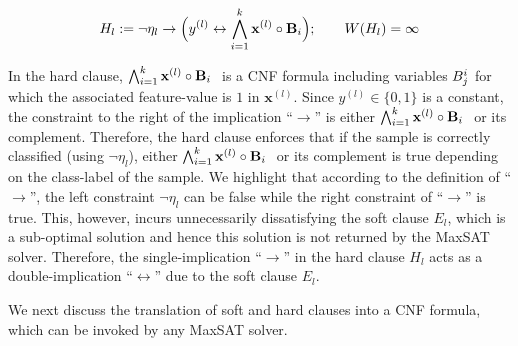 \begin{itemize}
	\begin{equation}
			\label{interpretability_imli_hard_clause_rule_consistency}
		H_l:= \neg \eta_l \rightarrow \Big(y^{(l)}\leftrightarrow \bigwedge_{i=1}^k {\mathbf{x}^{(l)}} \circ {\ensuremath{\mathbf{B}}_{i}}\Big); \qquad  W \! \left( H_l \right)=\infty
	\end{equation}
	
	In the hard clause, $ \bigwedge_{i=1}^k {\mathbf{x}^{(l)}} \circ {\ensuremath{\mathbf{B}}_{i}}\ $ is a CNF formula including variables $ B_j^i $ for which the associated  feature-value is $ 1 $ in  $ \mathbf{x}^{(l)} $. Since $ y^{(l)} \in \{0,1\} $ is a constant, the constraint to the right of the implication ``$ \rightarrow $'' is either  $ \bigwedge_{i=1}^k {\mathbf{x}^{(l)}} \circ {\ensuremath{\mathbf{B}}_{i}}\ $ or its complement. Therefore, the hard clause enforces that if the sample is correctly classified (using $ \neg \eta_l $), either  $ \bigwedge_{i=1}^k {\mathbf{x}^{(l)}} \circ {\ensuremath{\mathbf{B}}_{i}}\ $ or its complement is true depending on the class-label of the sample.  We highlight that according to the definition of ``$ \rightarrow $'', the left constraint $ \neg \eta_l $ can  be false while the right constraint of 	``$ \rightarrow $'' is true.  This, however, incurs unnecessarily dissatisfying the soft clause $ E_l $, which is a sub-optimal solution and hence this solution is not returned by the MaxSAT solver. Therefore, the single-implication ``$ \rightarrow $'' in the hard clause $ H_l $ acts as a double-implication ``$ \leftrightarrow $''  due to the soft clause $ E_l $. 
	

	


\end{itemize}

	  We next discuss the translation of soft and hard clauses into a CNF formula, which can be invoked by any MaxSAT solver. 

